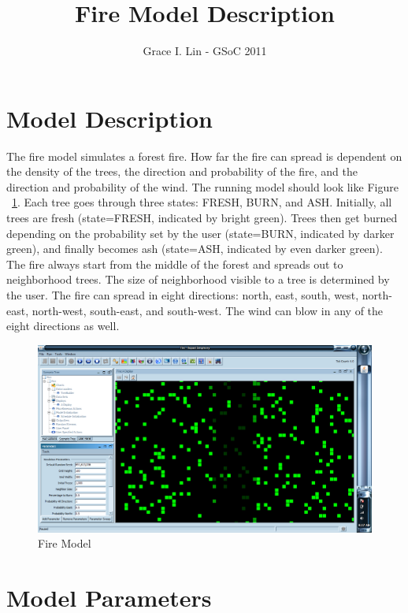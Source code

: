 \documentclass[11pt]{amsart}
\title{Fire Model Description}
\author{Grace I. Lin - GSoC 2011}
\begin{document}
 
\maketitle

\tableofcontents 

\section{Model Description}
The fire model simulates a forest fire.  How far the fire can spread is dependent on the density of the trees, the direction and probability of the fire, and the direction and probability of the wind.  The running model should look like Figure ~\ref{fig:fire_screen}.  Each tree goes through three states: FRESH, BURN, and ASH.  Initially, all trees are fresh (state=FRESH, indicated by bright green).  Trees then get burned depending on the probability set by the user (state=BURN, indicated by darker green), and finally becomes ash (state=ASH, indicated by even darker green).  The fire always start from the middle of the forest and spreads out to neighborhood trees.  The size of neighborhood visible to a tree is determined by the user.  The fire can spread in eight directions: north, east, south, west, north-east, north-west, south-east, and south-west.  The wind can blow in any of the eight directions as well.

\begin{figure}[h]
\begin{center}
\vspace{.2in}
\centerline {
\includegraphics[width=5in]{Images/fire_screen.png}}
\caption{Fire Model}
\label{fig:fire_screen}
\end{center}
\end{figure}


\section{Model Parameters}
\end{document}
